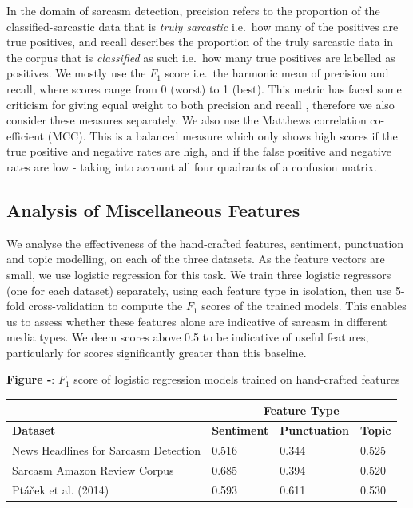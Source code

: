 \documentclass[12pt,a4paper]{article}
\begin{document}
\noindent In the domain of sarcasm detection, precision refers to the proportion of the classified-sarcastic data that is \textit{truly sarcastic} i.e.\ how many of the positives are true positives, and recall describes the proportion of the truly sarcastic data in the corpus that is \textit{classified} as such i.e.\ how many true positives are labelled as positives. We mostly use the $F_{1}$ score i.e.\ the harmonic mean of precision and recall, where scores range from 0 (worst) to 1 (best). This metric has faced some criticism for giving equal weight to both precision and recall \cite{hand2018note}, therefore we also consider these measures separately. We also use the Matthews correlation co-efficient (MCC). This is a balanced measure which only shows high scores if the true positive and negative rates are high, and if the false positive and negative rates are low - taking into account all four quadrants of a confusion matrix.

\subsection{Analysis of Miscellaneous Features}
\noindent We analyse the effectiveness of the hand-crafted features, sentiment, punctuation and topic modelling, on each of the three datasets. As the feature vectors are small, we use logistic regression for this task. We train three logistic regressors (one for each dataset) separately, using each feature type in isolation, then use 5-fold cross-validation to compute the $F_1$ scores of the trained models. This enables us to assess whether these features alone are indicative of sarcasm in different media types. We deem scores above 0.5 to be indicative of useful features, particularly for scores significantly greater than this baseline.


\begin{center}
	\textbf{Figure -}: $F_1$ score of logistic regression models trained on hand-crafted features
\end{center}

\begin{center}
	\begin{tabular}{|p{7cm}|p{1.8cm}|p{2.6cm}|p{1.6cm}|} 
		\hline
		& \multicolumn{3}{|c|}{\textbf{Feature Type}} \\
		\hline
		\textbf{Dataset} & \textbf{Sentiment} & \textbf{Punctuation} & \textbf{Topic} \\ [0.4ex] 
		\hline\hline
		News Headlines for Sarcasm Detection & 0.516 & 0.344 & 0.525\\ 
		\hline
		Sarcasm Amazon Review Corpus & 0.685 & 0.394 & 0.520\\ 
		\hline
		Pt\'a\v{c}ek et al. (2014) & 0.593 & 0.611 & 0.530\\
		\hline
	\end{tabular}
\end{center}
\end{document}

